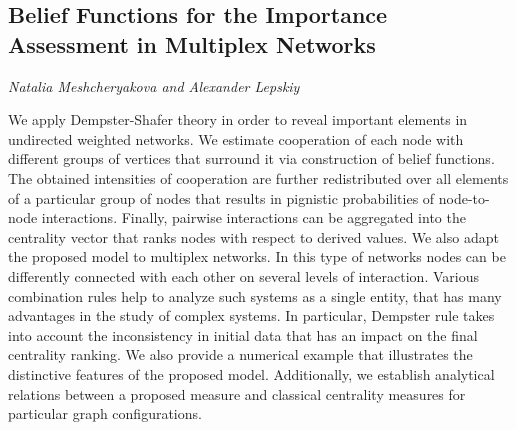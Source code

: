 \documentclass[../booklet.tex]{subfiles}
\begin{document}
\subsection[Belief Functions for the Importance Assessment in Multiplex Networks. {\it Natalia Meshcheryakova and Alexander Lepskiy}]{Belief Functions for the Importance Assessment in Multiplex Networks}
 

\begin{center}
  {\it Natalia Meshcheryakova and Alexander Lepskiy}
\end{center}

\vskip 0.8cm


We apply Dempster-Shafer theory in order to reveal important elements in undirected weighted networks. We estimate cooperation of each node with different groups of vertices that surround it via construction of belief functions. The obtained intensities of cooperation are further redistributed over all elements of a particular group of nodes that results in pignistic probabilities of node-to-node interactions. Finally, pairwise interactions can be aggregated into the centrality vector that ranks nodes with respect to derived values. We also adapt the proposed model to multiplex networks. In this type of networks nodes can be differently connected with each other on several levels of interaction. Various combination rules help to analyze such systems as a single entity, that has many advantages in the study of complex systems. In particular, Dempster rule takes into account the inconsistency in initial data that has an impact on the final centrality ranking. We also provide a numerical example that illustrates the distinctive features of the proposed model. Additionally, we establish analytical relations between a proposed measure and classical centrality measures for particular graph configurations.

\end{document}
